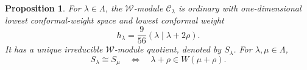 \documentclass[11pt]{amsart}
\numberwithin{equation}{section}
\newtheorem{proposition}[theorem]{Proposition}
\theoremstyle{definition}
\theoremstyle{remark}
\begin{document}
\begin{proposition}\label{prop:cyclic-coset-modules}
For $\lambda\in\Lambda$, the $\mathcal W$-module $\mathcal C_\lambda$ is ordinary
with one-dimensional lowest conformal-weight space and lowest
conformal weight
\begin{equation}\label{eq:coset-lowest-weight}
 h_\lambda=\frac9{56}(\lambda\mid\lambda+2\rho).
\end{equation}
It has a unique irreducible $\mathcal W$-module quotient, denoted by $S_\lambda$.
For $\lambda,\mu\in\Lambda$,
\begin{equation}\label{eq:simple-coset-equivalence}
 S_\lambda\cong S_\mu
 \quad\Longleftrightarrow\quad
 \lambda+\rho\in W(\mu+\rho).
\end{equation}
\end{proposition}
\end{document}
